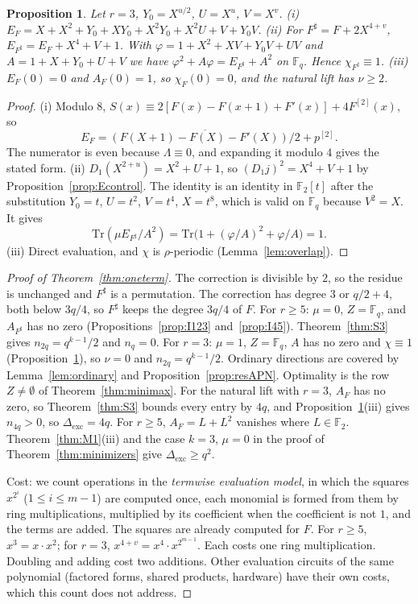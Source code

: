 \documentclass[11pt]{article}
\newtheorem{proposition}[theorem]{Proposition}
\theoremstyle{definition}
\theoremstyle{remark}
\newcommand{\F}{\mathbb{F}}
\newcommand{\Tr}{\mathrm{Tr}}
\newcommand{\ol}[1]{\overline{#1}}
\newcommand{\Dexc}{\Delta_{\mathrm{exc}}}
\begin{document}
\begin{proposition}\label{prop:I678}
Let $r=3$, $Y_0=X^{u/2}$, $U=X^u$, $V=X^v$.
(i) $E_F=X+X^2+Y_0+XY_0+X^2Y_0+X^2U+V+Y_0V$.
(ii) For $F^\sharp=F+2X^{4+v}$, $E_{F^\sharp}=E_F+X^4+V+1$. With $\varphi=1+X^2+XV+Y_0V+UV$ and
$A=1+X+Y_0+U+V$ we have $\varphi^2+A\varphi=E_{F^\sharp}+A^2$ on $\F_q$. Hence $\chi_{F^\sharp}\equiv1$.
(iii) $E_F(0)=0$ and $A_F(0)=1$, so $\chi_F(0)=0$, and the natural lift has $\nu\ge2$.
\end{proposition}
\begin{proof}
(i) Modulo $8$, $S(x)\equiv2[F(x)-F(x+1)+F'(x)]+4F^{[2]}(x)$, so
\[E_F=\ol{(F(X+1)-F(X)-F'(X))/2}+p^{[2]}.\]
The numerator is even because $\Lambda\equiv0$, and expanding it
modulo $4$ gives the stated form. (ii) $D_1(X^{2+u})=X^2+U+1$, so $(D_1j)^2=X^4+V+1$ by
Proposition~\ref{prop:Econtrol}. The identity is an identity in $\F_2[t]$ after the substitution $Y_0=t$,
$U=t^2$, $V=t^4$, $X=t^8$, which is valid on $\F_q$ because $V^2=X$. It gives
\[\Tr(\mu E_{F^\sharp}/A^2)=\Tr\bigl(1+(\varphi/A)^2+\varphi/A\bigr)=1.\]
(iii) Direct evaluation, and $\chi$ is $\rho$-periodic
(Lemma~\ref{lem:overlap}).
\end{proof}

\begin{proof}[Proof of Theorem~\ref{thm:oneterm}]
The correction is divisible by $2$, so the residue is unchanged and $F^\sharp$ is a permutation. The correction
has degree $3$ or $q/2+4$, both below $3q/4$, so $F^\sharp$ keeps the degree $3q/4$ of $F$. For $r\ge5$: $\mu=0$, $Z=\F_q$, and $A_{F^\sharp}$ has no zero
(Propositions~\ref{prop:I123} and~\ref{prop:I45}). Theorem~\ref{thm:S3} gives $n_{2q}=q^{k-1}/2$ and
$n_q=0$. For $r=3$: $\mu=1$, $Z=\F_q$, $A$ has no zero and $\chi\equiv1$ (Proposition~\ref{prop:I678}),
so $\nu=0$ and $n_{2q}=q^{k-1}/2$. Ordinary directions are covered by Lemma~\ref{lem:ordinary} and
Proposition~\ref{prop:resAPN}. Optimality is the row $Z\ne\emptyset$ of Theorem~\ref{thm:minimax}. For the
natural lift with $r=3$, $A_F$ has no zero, so Theorem~\ref{thm:S3} bounds every entry by $4q$, and
Proposition~\ref{prop:I678}(iii) gives $n_{4q}>0$, so $\Dexc=4q$. For $r\ge5$,
$A_F=L+L^2$ vanishes where $L\in\F_2$. Theorem~\ref{thm:M1}(iii) and the case $k=3$, $\mu=0$ in the proof of
Theorem~\ref{thm:minimizers} give $\Dexc\ge q^2$.

Cost: we count operations in the \emph{termwise evaluation model}, in which the squares $x^{2^i}$ ($1\le i\le m-1$)
are computed once, each monomial is formed from them by ring multiplications, multiplied by its coefficient when
the coefficient is not $1$, and the terms are added. The squares are already computed for $F$. For $r\ge5$,
$x^3=x\cdot x^2$; for $r=3$, $x^{4+v}=x^4\cdot x^{2^{m-1}}$. Each costs one ring multiplication. Doubling and adding cost
two additions. Other evaluation circuits of the same polynomial (factored forms, shared products, hardware) have their
own costs, which this count does not address.
\end{proof}
\end{document}
